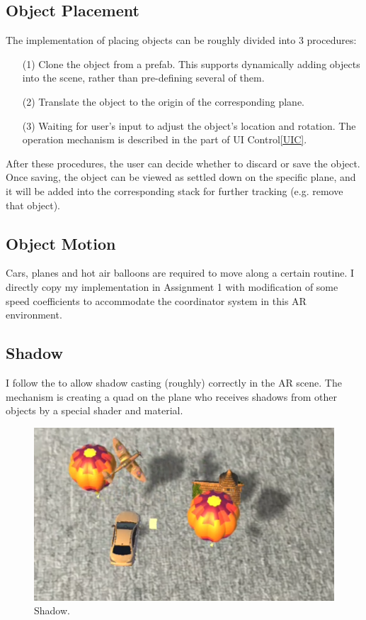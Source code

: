 \documentclass[11pt]{article}
\begin{document}
	\subsection{Object Placement}
	The implementation of placing objects can be roughly divided into 3 procedures:
	\begin{itemize}
		\item[(1)] Clone the object from a prefab. This supports dynamically adding objects into the scene, rather than pre-defining several of them.
		\item[(2)] Translate the object to the origin of the corresponding plane.
		\item[(3)] Waiting for user's input to adjust the object's location and rotation. The operation mechanism is described in the part of UI Control\ref{UIC}.
	\end{itemize}
	After these procedures, the user can decide whether to discard or save the object. Once saving, the object can be viewed as settled down on the specific plane, and it will be added into the corresponding stack for further tracking (e.g. remove that object). 
	
	\subsection{Object Motion}
	Cars, planes and hot air balloons are required to move along a certain routine. I directly copy my implementation in Assignment 1 with modification of some speed coefficients to accommodate the coordinator system in this AR environment.
	
	\subsection{Shadow}
	I follow the \cite{arshadow} to allow shadow casting (roughly) correctly in the AR scene. The mechanism is creating a quad on the plane who receives shadows from other objects by a special shader and material.
	\begin{figure}[htbp]
		\centering
		\includegraphics[width=.80\textwidth]{fig/shadow.png}
		\caption{Shadow.}
		\label{fig:shadow}
	\end{figure}
\end{document}
